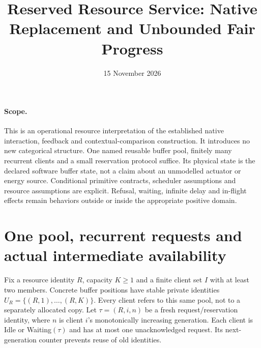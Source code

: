 \documentclass[11pt]{article}
\title{Reserved Resource Service: Native Replacement and Unbounded Fair Progress}
\date{15 November 2026}
\begin{document}
\maketitle

\paragraph{Scope.} This is an operational resource interpretation of the established native interaction, feedback and contextual-comparison construction. It introduces no new categorical structure. One named reusable buffer pool, finitely many recurrent clients and a small reservation protocol suffice. Its physical state is the declared software buffer state, not a claim about an unmodelled actuator or energy source. Conditional primitive contracts, scheduler assumptions and resource assumptions are explicit. Refusal, waiting, infinite delay and in-flight effects remain behaviors outside or inside the appropriate positive domain.

\section{One pool, recurrent requests and actual intermediate availability}

Fix a resource identity $R$, capacity $K\geq1$ and a finite client set $I$ with at least two members. Concrete buffer positions have stable private identities $U_R=\{(R,1),\ldots,(R,K)\}$. Every client refers to this same pool, not to a separately allocated copy. Let $\tau=(R,i,n)$ be a fresh request/reservation identity, where $n$ is client $i$'s monotonically increasing generation. Each client is Idle or Waiting$(\tau)$ and has at most one unacknowledged request. Its next-generation counter prevents reuse of old identities.
\end{document}
